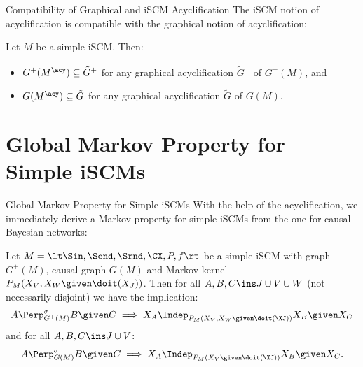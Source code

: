 \begin{frame}{Compatibility of Graphical and iSCM Acyclification}
  The iSCM notion of acyclification is compatible with the graphical notion of acyclification:
  \begin{Prp}[\ref{prp:acyclifications_compatible}]
    Let $M$ be a simple iSCM.
    Then:
    \begin{itemize}
      \item $G^+(M^\acy) \subseteq \tilde{G}^+$ for any graphical acyclification $\tilde{G}^+$ of $G^+(M)$, and
      \item $G(M^\acy) \subseteq \tilde{G}$ for any graphical acyclification $\tilde{G}$ of $G(M)$.
    \end{itemize}
  \end{Prp}
\end{frame}

\part{Global Markov Property for Simple iSCMs}
\frame{\partpage}

\begin{frame}{Global Markov Property for Simple iSCMs}
  With the help of the acyclification, we immediately derive a Markov property for simple iSCMs from the one for causal Bayesian networks:
  \begin{Cor}[\ref{cor:gmp_simple_scm}]
    Let $M = \lt \Sin, \Send, \Srnd, \CX, P, f \rt$ be a simple iSCM with graph $G^+(M)$, causal graph $G(M)$
    and Markov kernel $P_{M}(X_V,X_W \given \doit(X_J))$.
    Then for all $A, B, C \ins J \cup V \cup W$ (not necessarily disjoint) we have the implication:
    $$A \Perp^\sigma_{G^+(M)} B \given C \implies X_A \Indep_{P_{M}(X_V,X_W \given \doit(\XJ))} X_B \given X_C$$
    and for all $A, B, C \ins J \cup V$:
    $$A \Perp^\sigma_{G(M)} B \given C \implies X_A \Indep_{P_{M}(X_V \given \doit(\XJ))} X_B \given X_C.$$
  \end{Cor}
\end{frame}

